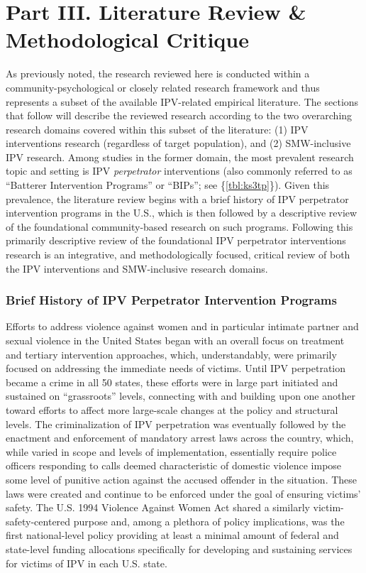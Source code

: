 \documentclass[11pt,]{tufte-book}
\begin{document}
\part{Part III. Literature Review \& Methodological Critique}

As previously noted, the research reviewed here is conducted within a
community-psychological or closely related research framework and thus
represents a subset of the available IPV-related empirical literature.
The sections that follow will describe the reviewed research according
to the two overarching research domains covered within this subset of
the literature: (1) IPV interventions research (regardless of target
population), and (2) SMW-inclusive IPV research. Among studies in the
former domain, the most prevalent research topic and setting is IPV
\emph{perpetrator} interventions (also commonly referred to as
``Batterer Intervention Programs'' or ``BIPs''; see
\{\cref{tbl:ks3tp}\}). Given this prevalence, the
literature review begins with a brief history of IPV perpetrator
intervention programs in the U.S., which is then followed by a
descriptive review of the foundational community-based research on such
programs. Following this primarily descriptive review of the
foundational IPV perpetrator interventions research is an integrative,
and methodologically focused, critical review of both the IPV
interventions and SMW-inclusive research domains.

\section{Brief History of IPV Perpetrator Intervention
Programs}\label{brief-history-of-ipv-perpetrator-intervention-programs}

Efforts to address violence against women and in particular intimate
partner and sexual violence in the United States began with an overall
focus on treatment and tertiary intervention approaches, which,
understandably, were primarily focused on addressing the immediate needs
of victims. Until IPV perpetration became a crime in all 50 states,
these efforts were in large part initiated and sustained on
``grassroots'' levels, connecting with and building upon one another
toward efforts to affect more large-scale changes at the policy and
structural levels. The criminalization of IPV perpetration was
eventually followed by the enactment and enforcement of mandatory arrest
laws across the country, which, while varied in scope and levels of
implementation, essentially require police officers responding to calls
deemed characteristic of domestic violence impose some level of punitive
action against the accused offender in the situation. These laws were
created and continue to be enforced under the goal of ensuring victims'
safety. The U.S. 1994 Violence Against Women Act shared a similarly
victim-safety-centered purpose and, among a plethora of policy
implications, was the first national-level policy providing at least a
minimal amount of federal and state-level funding allocations
specifically for developing and sustaining services for victims of IPV
in each U.S. state.
\end{document}
